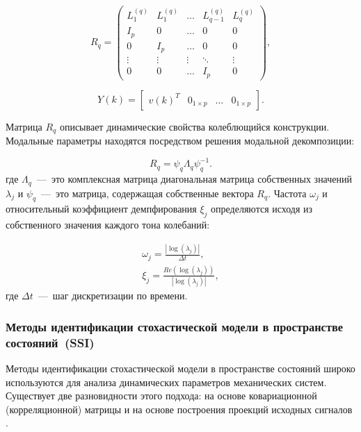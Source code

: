 \begin{equation}
	R_q = 
	\begin{pmatrix}
		L_1^{(q)} & L_1^{(q)} & \dots & L_{q-1}^{(q)} & L_q^{(q)} \\
		I_p & 0 & \dots & 0 & 0 \\ 
		0 & I_p & \dots & 0 & 0 \\ 
		\vdots & \vdots & \vdots & \ddots & \vdots \\ 
		0 & 0 & \dots & I_p & 0 
	\end{pmatrix},
\end{equation}

\begin{equation}
	Y(k) = \begin{bmatrix} v(k)^T & 0_{1 \times p} & \dots & 0_{1 \times p} \end{bmatrix}.
\end{equation}

Матрица $ R_q $ описывает динамические свойства колеблющийся конструкции. Модальные параметры находятся посредством решения модальной декомпозиции:

\begin{equation}
	R_q = \psi_q \Lambda_q \psi_q^{-1}.
\end{equation}
где $ \Lambda_q $~---~это комплексная матрица диагональная матрица собственных значений $ \lambda_j $ и $ \psi_q $~---~это матрица, содержащая собственные вектора $ R_q $. Частота $ \omega_j $ и относительный коэффициент демпфирования $ \xi_j $ определяются исходя из собственного значения каждого тона колебаний:

\begin{gather}
	\omega_j = \frac{|\log(\lambda_j)|}{\Delta t}, \\
	\xi_j = \frac{Re(\log(\lambda_j))}{|\log(\lambda_j)|},
\end{gather}
где $ \Delta t $~---~шаг дискретизации по времени.

\subsubsection{Методы идентификации стохастической модели в пространстве состояний~(SSI)}

Методы идентификации стохастической модели в пространстве состояний широко используются для анализа динамических параметров механических систем. Существует две разновидности этого подхода: на основе ковариационной (корреляционной) матрицы  и на основе построения проекций исходных сигналов  \cite{lib:oma:Rainieri}. 

